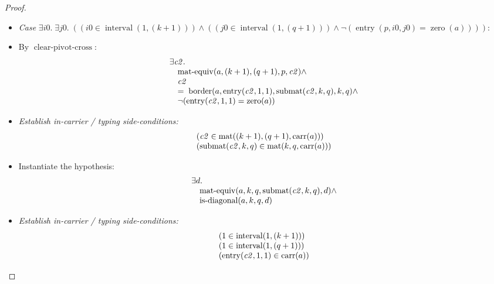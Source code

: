 \documentclass[11pt]{article}
\theoremstyle{plain}
\begin{document}
\begin{proof}
\begin{itemize}[leftmargin=2.8em, itemsep=4pt, parsep=1pt]
  \item[]\emph{Case} $\exists \mathit{i0}.\; \exists \mathit{j0}.\; ((\mathit{i0} \in \operatorname{interval}(1, (k + 1))) \wedge ((\mathit{j0} \in \operatorname{interval}(1, (q + 1))) \wedge \neg (\operatorname{entry}(p, \mathit{i0}, \mathit{j0}) = \operatorname{zero}(a))))$:
  \item[\textbf{76}] By $\operatorname{clear\text{-}pivot\text{-}cross}$:
\begin{equation*}
\begin{array}{@{}l@{}} \exists \mathit{c2}. \\ \quad \operatorname{mat\text{-}equiv}(a, (k + 1), (q + 1), p, \mathit{c2}) \wedge \\ \quad \mathit{c2} \\ \quad =\; \operatorname{border}(a, \operatorname{entry}(\mathit{c2}, 1, 1), \operatorname{submat}(\mathit{c2}, k, q), k, q) \wedge \\ \quad \neg (\operatorname{entry}(\mathit{c2}, 1, 1) = \operatorname{zero}(a)) \end{array}
\end{equation*}

  \item[\textbf{77--81}] \emph{Establish in-carrier / typing side-conditions:}
\begin{equation*}
\begin{array}{@{}l@{}}
(\mathit{c2} \in \operatorname{mat}((k + 1), (q + 1), \operatorname{carr}(a))) \\
(\operatorname{submat}(\mathit{c2}, k, q) \in \operatorname{mat}(k, q, \operatorname{carr}(a)))
\end{array}
\end{equation*}

  \item[\textbf{82--83}] Instantiate the hypothesis:
\begin{equation*}
\begin{array}{@{}l@{}} \exists d. \\ \quad \operatorname{mat\text{-}equiv}(a, k, q, \operatorname{submat}(\mathit{c2}, k, q), d) \wedge \\ \quad \operatorname{is\text{-}diagonal}(a, k, q, d) \end{array}
\end{equation*}

  \item[\textbf{84--88}] \emph{Establish in-carrier / typing side-conditions:}
\begin{equation*}
\begin{array}{@{}l@{}}
(1 \in \operatorname{interval}(1, (k + 1))) \\
(1 \in \operatorname{interval}(1, (q + 1))) \\
(\operatorname{entry}(\mathit{c2}, 1, 1) \in \operatorname{carr}(a))
\end{array}
\end{equation*}


\end{itemize}
\end{proof}
\end{document}
